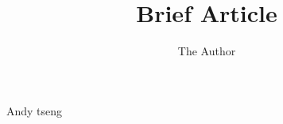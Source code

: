 \documentclass[11pt]{amsart}
\title{Brief Article}
\author{The Author}
\begin{document}
\maketitle
Andy tseng
\end{document}

